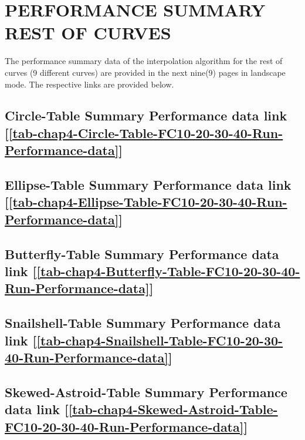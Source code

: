 \clearpage
\pagebreak
\section{PERFORMANCE SUMMARY REST OF CURVES} 
\label{Performance Summary Rest of Curves}

The performance summary data of the interpolation algorithm for the rest of curves (9 different curves) are provided in the next nine(9) pages in landscape mode. The respective links are provided below.

\subsection      {Circle-Table Summary Performance data link
[\ref  {tab-chap4-Circle-Table-FC10-20-30-40-Run-Performance-data}] }
\label{ssec-chap4-Circle-Table-FC10-20-30-40-Run-Performance-data}

\subsection      {Ellipse-Table Summary Performance data link
[\ref  {tab-chap4-Ellipse-Table-FC10-20-30-40-Run-Performance-data}] }
\label{ssec-chap4-Ellipse-Table-FC10-20-30-40-Run-Performance-data}

\subsection      {Butterfly-Table Summary Performance data link
[\ref  {tab-chap4-Butterfly-Table-FC10-20-30-40-Run-Performance-data}] }
\label{ssec-chap4-Butterfly-Table-FC10-20-30-40-Run-Performance-data}

\subsection      {Snailshell-Table Summary Performance data link
[\ref  {tab-chap4-Snailshell-Table-FC10-20-30-40-Run-Performance-data}] }
\label{ssec-chap4-Snailshell-Table-FC10-20-30-40-Run-Performance-data}

\subsection      {Skewed-Astroid-Table Summary Performance data link
[\ref  {tab-chap4-Skewed-Astroid-Table-FC10-20-30-40-Run-Performance-data}] }
\label{ssec-chap4-Skewed-Astroid-Table-FC10-20-30-40-Run-Performance-data}


